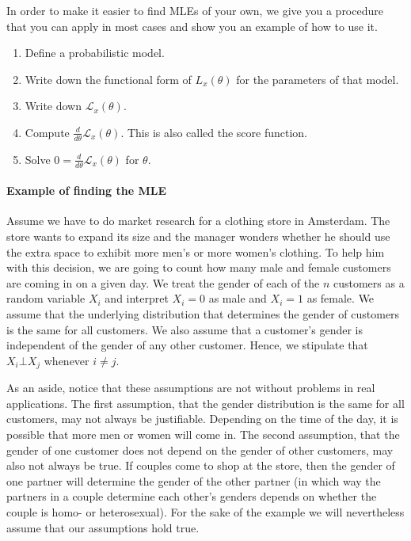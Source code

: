 In order to make it easier to find MLEs of your own, we give you a procedure that you can apply in most cases and
show you an example of how to use it.
\begin{enumerate}
\item Define a probabilistic model.
\item Write down the functional form of $ L_{x}(\theta) $ for the parameters of that model.
\item Write down $ \mathcal{L}_{x}(\theta) $.
\item Compute $ \frac{d}{d \theta} \mathcal{L}_{x}(\theta) $. This is also called the score function.
\item Solve $ 0 = \frac{d}{d \theta} \mathcal{L}_{x}(\theta) $ for $ \theta $.
\end{enumerate}

\paragraph{Example of finding the MLE} Assume we have to do market research for a clothing store in Amsterdam.
The store wants to expand its size and the manager wonders whether he should use the extra space to 
exhibit more men's or more women's clothing. To help him with this decision, we are going to count 
how many male and female customers are coming in on a given day. We treat the gender of each of the $n$ customers
as a random variable $ X_{i}$ and interpret $ X_{i} = 0 $ as male and $ X_{i} = 1 $ as
female. We assume that the underlying distribution that determines the gender of customers
is the same for all customers. We also assume that a customer's gender is independent of the gender of any
other customer. Hence, we stipulate that $ X_{i} \bot X_{j} $ whenever $ i \not = j $.

As an aside, notice that these assumptions are not without problems in real applications. 
The first assumption, that the gender
distribution is the same for all customers, may not always be justifiable. Depending on the time of the day,
it is possible that more men or women will come in. The second assumption, that the gender of one customer
does not depend on the gender of other customers, may also not always be true. If couples come to shop
at the store, then the gender of one partner will determine the gender of the other partner (in which
way the partners in a couple determine each other's genders depends on whether the couple is homo- or
heterosexual). For the sake of the example we will nevertheless assume that our assumptions hold true.

